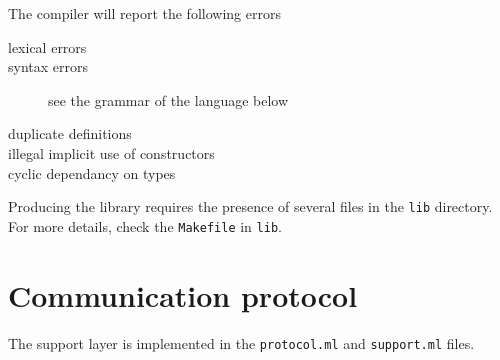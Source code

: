 The compiler will report the following errors
\begin{description}
\item[lexical errors]
\item[syntax errors] see the grammar of the language below
\item[duplicate definitions]
\item[illegal implicit use of constructors]
\item[cyclic dependancy on types]
\end{description} 

Producing the library requires the presence of several files in the
\verb|lib| directory. For more details, check the \verb|Makefile| in
\verb|lib|. 

\section{Communication protocol}
The support layer is implemented in the \verb|protocol.ml| and
\verb|support.ml| files.

